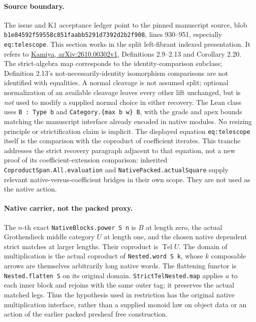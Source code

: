 \documentclass[11pt]{article}
\newcommand{\Tel}{\operatorname{Tel}}
\begin{document}
\paragraph{Source boundary.}
The issue and K1 acceptance ledger point to the pinned manuscript source, blob
\texttt{b1e84592f59558c851faabb5291d7392d2b2f908}, lines 930--951, especially
\verb|eq:telescope|. This section works in the split left-fibrant indexed presentation. It refers to \href{https://hexagonmath.org/pdf/2610.00302v1}{Kamiya, arXiv:2610.00302v1}, Definitions 2.9--2.13 and Corollary 2.20. The strict-algebra map corresponds to the identity-comparison subclass; Definition 2.13's not-necessarily-identity isomorphism comparisons are not identified with equalities. A normal cleavage is not assumed split; optional normalization of an available cleavage leaves every other lift unchanged, but is \emph{not} used to modify a supplied normal choice in either recovery. The Lean class uses \verb|B : Type b| and \verb|Category.{max b w} B|, with the grade and apex bounds matching the manuscript interface already encoded in native modules. No resizing principle or strictification claim is implicit.
The displayed equation \verb|eq:telescope| itself is the comparison with the coproduct of coefficient iterates. This tranche addresses the strict recovery paragraph adjacent to that equation, not a new proof of its coefficient-extension comparison: inherited \verb|CoproductSpan.All.evaluation| and \verb|NativePacked.actualSquare| supply relevant native-versus-coefficient bridges in their own scope. They are not used as the native action.

\paragraph{Native carrier, not the packed proxy.}
The \(n\)-th exact \verb|NativeBlocks.power S n| is \(B\) at length zero, the actual Grothendieck middle category \(U\) at length one, and the chosen native dependent strict matches at larger lengths. Their coproduct is \(\Tel U\). The domain of multiplication is the actual coproduct of \verb|Nested.word S k|, whose \(k\) composable arrows are themselves arbitrarily long native words. The flattening functor is \verb|Nested.flatten S| on its original domain. \verb|StrictTelNested.map| applies \(a\) to each inner block and rejoins with the same outer tag; it preserves the actual matched legs. Thus the hypothesis used in restriction has the original native multiplication interface, rather than a supplied monoid law on object data or an action of the earlier packed presheaf free construction.
\end{document}
